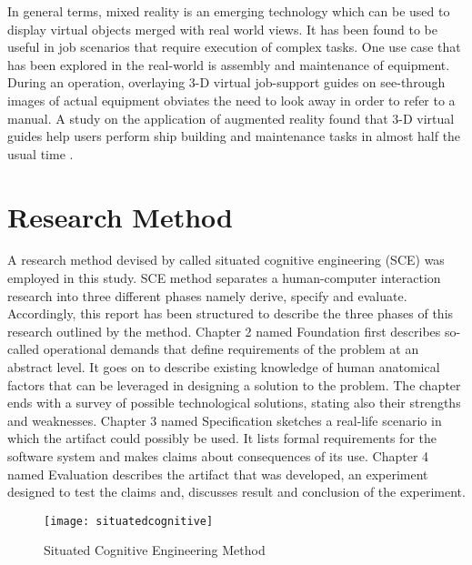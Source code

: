 
In general terms, mixed reality is an emerging technology which can be used to display virtual objects merged with real world views. It has been found to be useful in job scenarios that require execution of complex tasks. One use case that has been explored in the real-world is assembly and maintenance of equipment. During an operation, overlaying 3-D virtual job-support guides on see-through images of actual equipment obviates the need to look away in order to refer to a manual. A study on the application of augmented reality found that 3-D virtual guides help users perform ship building and maintenance tasks in almost half the usual time \parencite{henderson2011exploring}.



\section{Research Method}
A research method devised by \cite{neerincx2008situated} called situated cognitive engineering (SCE) was employed in this study. SCE method separates a human-computer interaction research into three different phases namely derive, specify and evaluate. Accordingly, this report has been structured to describe the three phases of this research outlined by the method. Chapter 2 named Foundation first describes so-called operational demands that define requirements of the problem at an abstract level. It goes on to describe existing knowledge of human anatomical factors that can be leveraged in designing a solution to the problem. The chapter ends with a survey of possible technological solutions, stating also their strengths and weaknesses. Chapter 3 named Specification sketches a real-life scenario in which the artifact could possibly be used. It lists formal requirements for the software system and makes claims about consequences of its use. Chapter 4 named Evaluation describes the artifact that was developed, an experiment designed to test the claims and, discusses result and conclusion of the experiment. 

\begin{figure}
	\centering
	\texttt{[image: situatedcognitive]}
	\caption{Situated Cognitive Engineering Method \parencite{neerincx2008situated}}
	\label{fig:augreal}
\end{figure}
